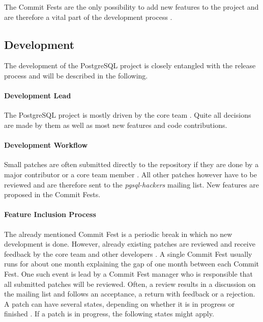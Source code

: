 The Commit Fests are the only possibility to add new features to the project and
are therefore a vital part of the development process
\cite{PostgreSQLDevelopment,PostgreSQLCommitFest}. 

\subsection{Development}

The development of the PostgreSQL project is closely entangled with the release
process and will be described in the following.

\paragraph{Development Lead}

The PostgreSQL project is mostly driven by the core team
\cite{PostgreSQLDevFAQ,PostgreSQLFAQ,PostgreSQLContributors}. Quite all
decisions are made by them as well as most new features and code contributions.

\paragraph{Development Workflow}

Small patches are often submitted directly to the repository if they are done
by a major contributor or a core team member \cite{PostgreSQLDevFAQ}. All other
patches however have to be reviewed and are therefore sent to the
\emph{pgsql-hackers} mailing list. New features are proposed in the Commit
Fests.

\paragraph{Feature Inclusion Process}

The already mentioned Commit Fest is a periodic break in which no new
development is done. However, already existing patches are reviewed and receive
feedback by the core team and other developers \cite{PostgreSQLCommitFest}. A
single Commit Fest usually runs for about one month explaining the gap of one
month between each Commit Fest. One such event is lead by a Commit Fest manager
who is responsible that all submitted patches will be reviewed. Often, a review
results in a discussion on the mailing list and follows an acceptance, a return
with feedback or a rejection. A patch can have several states, depending on
whether it is in progress or finished \cite{PostgreSQLCommitFestRunning}. If a
patch is in progress, the following states might apply.


